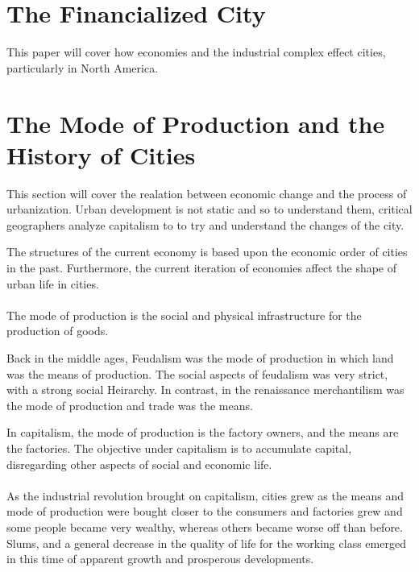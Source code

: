 \documentclass[12pt]{book}
\title{\coursetitle\linebreak\lecturename}
\author{\\Cain Susko\\ 
           \\ \\ \\
      Queen's University 
    \\School of Computing\\}
\begin{document}
\begin{titlepage}
        \maketitle
\end{titlepage}


\section*{The Financialized City}
This paper will cover how economies and the industrial complex effect cities, particularly in North America. 


\section*{The Mode of Production and the History of Cities}
This section will cover the realation between economic change and the process of urbanization.
Urban development is not static and so to understand them, critical geographers analyze capitalism to 
to try and understand the changes of the city.

The structures of the current economy is based upon the economic order of cities in the past. Furthermore, the 
current iteration of economies affect the shape of urban life in cities.

\paragraph{}
The mode of production is the social and physical infrastructure for the production of goods.

Back in the middle ages, Feudalism was the mode of production in which land was the means of production. The 
social aspects of feudalism was very strict, with a strong social Heirarchy. In contrast, in the renaissance 
merchantilism was the mode of production and trade was the means.

In capitalism, the mode of production is the factory owners, and the means are the factories. The objective under
capitalism is to accumulate capital, disregarding other aspects of social and economic life.

\paragraph{}
As the industrial revolution brought on capitalism, cities grew as the means and mode of production were bought 
closer to the consumers and factories grew and some people became very wealthy, whereas others became worse off 
than before. Slums, and a general decrease in the quality of 
life for the working class emerged in this time of apparent growth and prosperous developments.
\end{document}

